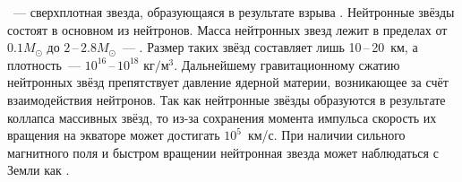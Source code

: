 ~--- сверхплотная звезда, образующаяся в результате взрыва . Нейтронные звёзды состоят в основном из нейтронов. Масса нейтронных звезд лежит в пределах от $0.1M_{\odot}$ до $2$\,--\,$2.8M_{\odot}$~--- . Размер таких звёзд составляет лишь 10\,--\,20~км, а плотность~--- $10^{16}$\,--\,$10^{18}$ $\text{кг}/\text{м}^3$.  Дальнейшему гравитационному сжатию нейтронных звёзд препятствует давление ядерной материи, возникающее за счёт взаимодействия нейтронов. Так как нейтронные звёзды образуются в результате  коллапса массивных звёзд, то из-за сохранения момента импульса скорость их вращения на экваторе может достигать $10^5$~км/с. При наличии сильного магнитного поля и быстром вращении нейтронная звезда может наблюдаться с Земли как .


